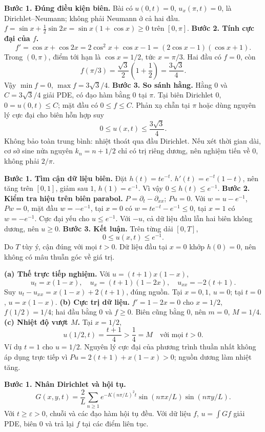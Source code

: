 \textbf{Bước 1. Đúng điều kiện biên.} Bài có $u(0,t)=0$, $u_x(\pi,t)=0$, là Dirichlet–Neumann; không phải Neumann ở cả hai đầu. $f=\sin x+\frac12\sin2x=\sin x(1+\cos x)\ge0$ trên $[0,\pi]$.
\textbf{Bước 2. Tính cực đại của $f$.}
\[f'=\cos x+\cos2x=2\cos^2x+\cos x-1
=(2\cos x-1)(\cos x+1).\]
Trong $(0,\pi)$, điểm tới hạn là $\cos x=1/2$, tức $x=\pi/3$. Hai đầu có $f=0$, còn
\[f(\pi/3)=\frac{\sqrt3}2\left(1+\frac12\right)=\frac{3\sqrt3}4.\]
Vậy $\min f=0$, $\max f=3\sqrt3/4$.
\textbf{Bước 3. So sánh hằng.} Hằng $0$ và $C=3\sqrt3/4$ giải PDE, có đạo hàm bằng $0$ tại $\pi$. Tại biên Dirichlet $0$, $0=u(0,t)\le C$; mặt đầu có $0\le f\le C$. Phản xạ chẵn tại $\pi$ hoặc dùng nguyên lý cực đại cho biên hỗn hợp suy
\[0\le u(x,t)\le\frac{3\sqrt3}4.\]
Không bảo toàn trung bình: nhiệt thoát qua đầu Dirichlet. Nếu xét thời gian dài, cơ sở sine nửa nguyên $k_n=n+1/2$ chỉ có trị riêng dương, nên nghiệm tiến về $0$, không phải $2/\pi$.

\textbf{Bước 1. Tìm cận dữ liệu biên.} Đặt $h(t)=te^{-t}$. $h'(t)=e^{-t}(1-t)$, nên tăng trên $[0,1]$, giảm sau $1$, $h(1)=e^{-1}$. Vì vậy $0\le h(t)\le e^{-1}$.
\textbf{Bước 2. Kiểm tra hiệu trên biên parabol.} $P=\partial_t-\partial_{xx}$; $Pu=0$. Với $w=u-e^{-1}$, $Pw=0$, mặt đầu $w=-e^{-1}$, tại $x=0$ có $w=te^{-t}-e^{-1}\le0$, tại $x=1$ có $w=-e^{-1}$. Cực đại yếu cho $u\le e^{-1}$. Với $-u$, cả dữ liệu đầu lẫn hai biên không dương, nên $u\ge0$.
\textbf{Bước 3. Kết luận.} Trên từng dải $[0,T]$,
\[0\le u(x,t)\le e^{-1}.\]
Do $T$ tùy ý, cận đúng với mọi $t>0$. Dữ liệu đầu tại $x=0$ khớp $h(0)=0$, nên không có mâu thuẫn góc về giá trị.

\textbf{(a) Thế trực tiếp nghiệm.} Với $u=(t+1)x(1-x)$,
\[u_t=x(1-x),\quad u_x=(t+1)(1-2x),\quad u_{xx}=-2(t+1).\]
Suy $u_t-u_{xx}=x(1-x)+2(t+1)$, đúng nguồn. Tại $x=0,1$, $u=0$; tại $t=0$, $u=x(1-x)$.
\textbf{(b) Cực trị dữ liệu.} $f'=1-2x=0$ cho $x=1/2$, $f(1/2)=1/4$; hai đầu bằng $0$ và $f\ge0$. Biên cũng bằng $0$, nên $m=0$, $M=1/4$.
\textbf{(c) Nhiệt độ vượt $M$.} Tại $x=1/2$,
\[u(1/2,t)=\frac{t+1}4>\frac14=M\quad\text{với mọi }t>0.\]
Ví dụ $t=1$ cho $u=1/2$. Nguyên lý cực đại của phương trình thuần nhất không áp dụng trực tiếp vì $Pu=2(t+1)+x(1-x)>0$; nguồn dương làm nhiệt tăng.

\textbf{Bước 1. Nhân Dirichlet và hội tụ.}
\[G(x,y,t)=\frac2L\sum_{n\ge1}e^{-K(n\pi/L)^2t}
\sin(n\pi x/L)\sin(n\pi y/L).\]
Với $t\ge\varepsilon>0$, chuỗi và các đạo hàm hội tụ đều. Với dữ liệu $f$, $u=\int Gf$ giải PDE, biên $0$ và trả lại $f$ tại các điểm liên tục.

